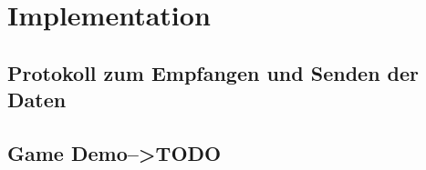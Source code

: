 \section{Implementation}

\subsection{Protokoll zum Empfangen und Senden der Daten}

\newpage

\subsection{Game Demo-->TODO} 

\newpage